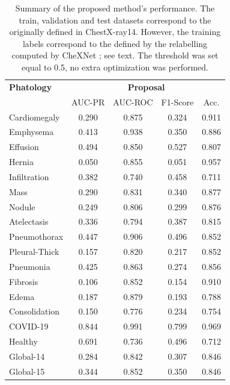 {\begin{table}[tb]
    \centering
    \begin{tabular}{|l||c|c|c|c|}
        \hline
    {\bf Phatology} 	    	&	\multicolumn{4}{c|}{\bf Proposal}  \\
    \cline{2-5}
                        &	AUC-PR	&	AUC-ROC 	& F1-Score  & Acc.  \\
        \hline \hline
        Cardiomegaly	&	0.290	&	0.875	&	0.324	&	0.911	\\
        Emphysema	    &	0.413	&	0.938	&	0.350	&	0.886	\\
        Effusion	    &	0.494	&	0.850	&	0.527	&	0.807	\\
        Hernia	        &	0.050	&	0.855	&	0.051	&	0.957	\\
        Infiltration	&	0.382	&	0.740	&	0.458	&	0.711	\\
        Mass	        &	0.290	&	0.831	&	0.340	&	0.877	\\
        Nodule	        &	0.249	&	0.806	&	0.299	&	0.876	\\
        Atelectasis	    &	0.336	&	0.794	&	0.387	&	0.815	\\
        Pneumothorax	&	0.447	&	0.906	&	0.496	&	0.852	\\
        Pleural-Thick	&	0.157	&	0.820	&	0.217	&	0.852	\\
        Pneumonia	    &	0.425	&	0.863	&	0.274	&	0.856	\\
        Fibrosis	    &	0.106	&	0.852	&	0.154	&	0.910	\\
        Edema	        &	0.187	&	0.879	&	0.193	&	0.788	\\
        Consolidation	&	0.150	&	0.776	&	0.234	&	0.754	\\
        \hline
        COVID-19	        &	0.844	&	0.991	&	0.799	&	0.969	\\
        Healthy	        &	0.691	&	0.736	&	0.496	&	0.712	\\
        \hline\hline
        Global-14	    &	0.284	&	0.842	&	0.307	&	0.846	\\
        Global-15	    &	0.344	&	0.852	&	0.350	&	0.846	\\
    \hline
    \end{tabular}
    \caption{Summary of the proposed method's performance. The train, validation and test datasets
             correspond to the originally defined in ChestX-ray14. However, the training labels
             correspond to the defined by the relabelling computed by CheXNet
             \cite{rajpurkar2018deep}; see text. The threshold was set equal to 0.5, no extra
             optimization was performed.}
    \label{table:res-model-covid}
\end{table}

}
